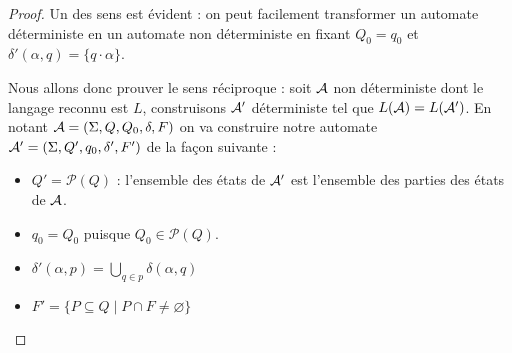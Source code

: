  \begin{proof}
    Un des sens est évident : on peut facilement transformer un automate déterministe en un automate non déterministe en fixant $Q_0=q_0$ et $\delta'(\alpha,q) = \{q\cdot \alpha\}$.

    Nous allons donc prouver le sens réciproque : soit $\mathcal A$ non déterministe dont le langage reconnu est $L$, construisons $\mathcal A'$ déterministe tel que $L(\mathcal A) = L(\mathcal A')$. En notant $\mathcal A = (\Sigma,Q,Q_0,\delta,F)$ on va construire notre automate $\mathcal A' = (\Sigma,Q',q_0,\delta',F')$ de la façon suivante :
    \begin{itemize}[label=$\bullet$]
        \item $Q'=\mathcal P(Q)$ : l'ensemble des états de $\mathcal A'$ est l'ensemble des parties des états de $\mathcal A$.
        \item $q_0 = Q_0$ puisque $Q_0\in \mathcal P(Q)$.
        \item $\delta'(\alpha,p) = \displaystyle{\bigcup_{q\in p}\delta(\alpha,q)}$
        \item $F' = \{P\subseteq Q\mid P\cap F \neq \varnothing\}$
    \end{itemize}


\end{proof}
